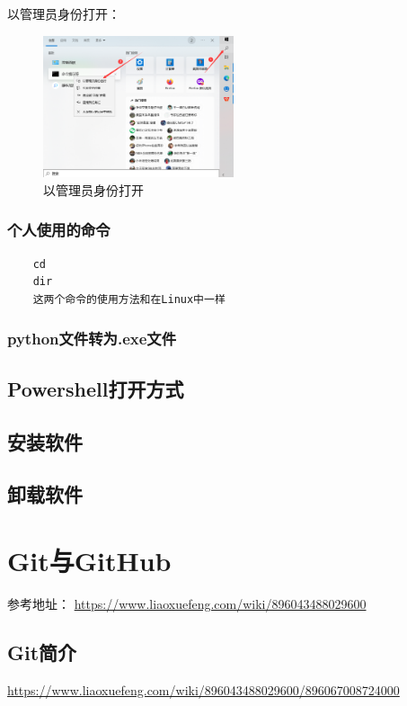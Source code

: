 \documentclass[12pt]{article}
\begin{document}
以管理员身份打开：

\begin{figure}[hbt!]
    \centering
    \includegraphics[width=0.5\textwidth]{img/guanliyuanshenfen.png}
    \caption{以管理员身份打开}
\end{figure}


\subsubsection{个人使用的命令}
\begin{verbatim}
    cd
    dir
    这两个命令的使用方法和在Linux中一样
\end{verbatim}

\subsubsection{python文件转为.exe文件}

\subsection{Powershell打开方式}

\subsection{安装软件}

\subsection{卸载软件}

\section{Git与GitHub}

参考地址：
\href{https://www.liaoxuefeng.com/wiki/896043488029600}{https://www.liaoxuefeng.com/wiki/896043488029600}

\subsection{Git简介}
\href{https://www.liaoxuefeng.com/wiki/896043488029600/896067008724000}{https://www.liaoxuefeng.com/wiki/896043488029600/896067008724000}
\end{document}
